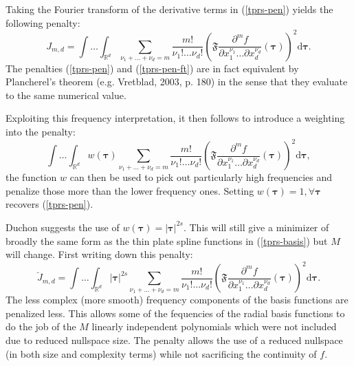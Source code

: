 \documentclass[useAMS,referee, usegraphicx]{biom}
\begin{document}
Taking the Fourier transform of the derivative terms in (\ref{tprs-pen}) yields the following penalty:
\begin{equation}
J_{m,d} = \int \ldots \int_{\mathbb{R}^d} \sum_{\nu_1 + \dots + \nu_d=m} \frac{m!}{\nu_1! \dots \nu_d!} \left ( \mathfrak{F} \frac{\partial^m f}{\partial x_1^{\nu_1} \ldots  \partial x_d^{\nu_d}} \left (  \boldsymbol{\tau}\right ) \right )^2 \text{d} \boldsymbol{\tau}.
\label{tprs-pen-ft}
\end{equation}
The penalties (\ref{tprs-pen}) and (\ref{tprs-pen-ft}) are in fact equivalent by Plancherel's theorem (e.g. Vretblad, 2003, p. 180) in the sense that they evaluate to the same numerical value.

Exploiting this frequency interpretation, it then follows to introduce a weighting into the penalty: 
\begin{equation}
\int \ldots \int_{\mathbb{R}^d} w(\boldsymbol{\tau}) \sum_{\nu_1 + \dots + \nu_d=m} \frac{m!}{\nu_1! \dots \nu_d!} \left ( \mathfrak{F} \frac{\partial^m f}{\partial x_1^{\nu_1} \ldots  \partial x_d^{\nu_d}} \left (\boldsymbol{\tau} \right ) \right )^2 \text{d} \boldsymbol{\tau},
\label{duchon-penalty-general}
\end{equation}
the function $w$ can then be used to pick out particularly high frequencies and penalize those more than the lower frequency ones. Setting $w(\boldsymbol{\tau})=1, \forall \boldsymbol{\tau}$ recovers (\ref{tprs-pen}).

Duchon suggests the use of $w(\boldsymbol{\tau})= \lvert \boldsymbol{\tau} \rvert^{2s}$. This will still give a minimizer of broadly the same form as the thin plate spline functions in (\ref{tprs-basis}) but $M$ will change. First writing down this penalty:
\begin{equation}
\breve{J}_{m,d} = \int \ldots \int_{\mathbb{R}^d} \lvert \boldsymbol{\tau} \rvert^{2s} \sum_{\nu_1 + \dots + \nu_d=m} \frac{m!}{\nu_1! \dots \nu_d!}\left ( \mathfrak{F} \frac{\partial^m f}{\partial x_1^{\nu_1} \ldots  \partial x_d^{\nu_d}} \left (\boldsymbol{\tau} \right ) \right )^2 \text{d} \boldsymbol{\tau}.
\label{duchon-penalty}
\end{equation}
The less complex (more smooth) frequency components of the basis functions are penalized less. This allows some of the fequencies of  the radial basis functions to do the job of the $M$ linearly independent polynomials which were not included due to reduced nullspace size. The penalty allows the use of a reduced nullspace (in both size and complexity terms) while not sacrificing the continuity of $f$. 
\end{document}
